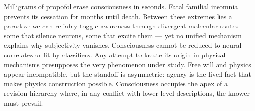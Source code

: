 Milligrams of propofol erase consciousness in seconds. Fatal familial insomnia prevents its cessation for months until death. Between these extremes lies a paradox: we can reliably toggle awareness through divergent molecular routes — some that silence neurons, some that excite them — yet no unified mechanism explains why subjectivity vanishes. Consciousness cannot be reduced to neural correlates or fit by classifiers. Any attempt to locate its origin in physical mechanisms presupposes the very phenomenon under study. Free will and physics appear incompatible, but the standoff is asymmetric: agency is the lived fact that makes physics construction possible. Consciousness occupies the apex of a revision hierarchy where, in any conflict with lower-level descriptions, the knower must prevail.